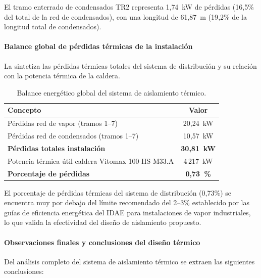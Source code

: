 \documentclass[12pt]{article}
\begin{document}
El tramo enterrado de condensados TR2 representa 1{,}74~kW de pérdidas (16{,}5\% del total de la red de condensados), con una longitud de 61{,}87~m (19{,}2\% de la longitud total de condensados).

\paragraph{Balance global de pérdidas térmicas de la instalación}
\label{par:balance_global_aislamiento}

La  sintetiza las pérdidas térmicas totales del sistema de distribución y su relación con la potencia térmica de la caldera.

\begin{table}[htbp]
	\centering
	\caption{Balance energético global del sistema de aislamiento térmico.}
	\label{tab:balance_global_aislamiento}
	\begin{tabular}{lc}
		\toprule
		\textbf{Concepto}                                  & \textbf{Valor}      \\
		\midrule
		Pérdidas red de vapor (tramos 1--7)                & 20{,}24~kW          \\
		Pérdidas red de condensados (tramos 1--7)          & 10{,}57~kW          \\
		\midrule
		\textbf{Pérdidas totales instalación}              & \textbf{30{,}81~kW} \\
		\midrule[0.5pt]
		Potencia térmica útil caldera Vitomax 100-HS M33.A & 4\,217~kW           \\
		\midrule
		\textbf{Porcentaje de pérdidas}                    & \textbf{0{,}73~\%}  \\
		\bottomrule
	\end{tabular}
\end{table}

El porcentaje de pérdidas térmicas del sistema de distribución (0{,}73\%) se encuentra muy por debajo del límite recomendado del 2--3\% establecido por las guías de eficiencia energética del IDAE para instalaciones de vapor industriales, lo que valida la efectividad del diseño de aislamiento propuesto.

\paragraph{Observaciones finales y conclusiones del diseño térmico}
\label{par:conclusiones_aislamiento}

Del análisis completo del sistema de aislamiento térmico se extraen las siguientes conclusiones:
\end{document}
